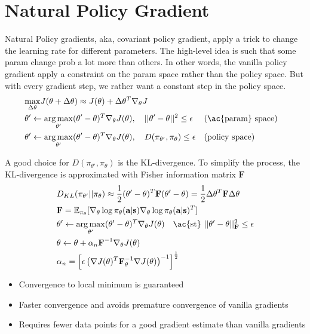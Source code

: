 \section{Natural Policy Gradient}
Natural Policy gradients, \ac{aka}, covariant policy gradient, apply a trick to change the learning rate for different parameters. The high-level idea is such that some \ac{param} change \ac{prob} a lot more than others. In other words, the vanilla policy gradient apply a constraint on the \ac{param} space rather than the policy space. But with every gradient step, we rather want a constant step in the policy space. \cite{kakade2001natural, peters2008nn}
\begin{align}
	& \underset{\Delta \theta}{\max} J (\theta + \Delta \theta) \approx J(\theta) + \Delta\theta^T \nabla_\theta J\\
	&\theta' \leftarrow \underset{\theta'}{\arg\max} (\theta'-\theta)^T \nabla_\theta J(\theta), \quad ||\theta' - \theta||^2 \leq \epsilon && \text{(\ac{param} space)}\\
	&\theta' \leftarrow \underset{\theta'}{\arg\max} (\theta'-\theta)^T \nabla_\theta J(\theta), \quad D(\pi_{\theta'}, \pi_{\theta}) \leq \epsilon && \text{(policy space)}
\end{align}

A good choice for $D(\pi_{\theta'}, \pi_{\theta})$ is the \ac{KL}-divergence. To simplify the process, the \ac{KL}-divergence is approximated with Fisher information matrix $\textbf{F}$ \cite{amari1998natural}
\begin{align}
	& D_{KL}(\pi_{\theta'} || \pi_{\theta}) \approx \frac{1}{2}(\theta' - \theta)^T \textbf{F} (\theta' - \theta) = \frac{1}{2} \Delta\theta^T \textbf{F} \Delta\theta\\
	&\textbf{F} = \mathbb{E}_{\pi_{\theta}} [ \nabla_\theta \log\pi_\theta(\textbf{a}|\textbf{s}) \nabla_\theta \log \pi_\theta (\textbf{a}|\textbf{s})^T ]\\
	&\theta' \leftarrow \underset{\theta'}{\arg\max} (\theta'-\theta)^T \nabla_\theta J(\theta) \quad \text{\ac{st} } ||\theta' - \theta||^2_\textbf{F} \leq \epsilon\\
	&\theta \leftarrow \theta + \alpha_n \textbf{F}^{-1} \nabla_\theta J(\theta)\\
	&\alpha_n = \left[ \epsilon \left(\nabla J(\theta)^T \textbf{F}_\theta^{-1} \nabla J(\theta) \right)^{-1} \right]^{\frac{1}{2}}
\end{align}

\begin{itemize}
	\item Convergence to local minimum is guaranteed
	\item Faster convergence and avoids premature convergence of vanilla gradients
	\item Requires fewer data points for a good gradient estimate than vanilla gradients
\end{itemize}

